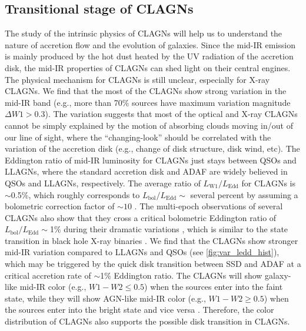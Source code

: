 \documentclass[linenumbers]{aastex631}
\begin{document}

%


\subsection{Transitional stage of CLAGNs}
The study of the intrinsic physics of CLAGNs will help us to understand the nature of accretion flow and the evolution of galaxies. Since the mid-IR emission is mainly produced by the hot dust heated by the UV radiation of the accretion disk, the mid-IR properties of CLAGNs can shed light on their central engines. The physical mechanism for CLAGNs is still unclear, especially for X-ray CLAGNs. We find that the most of the CLAGNs show strong variation in the mid-IR band (e.g., more than 70\% sources have maximum variation magnitude $\Delta W1>0.3$). The variation suggests that most of the optical and X-ray CLAGNs cannot be simply explained by the motion of absorbing clouds moving in/out of our line of sight, where the ``changing-look'' should be correlated with the variation of the accretion disk (e.g., change of disk structure, disk wind, etc). The Eddington ratio of mid-IR luminosity for CLAGNs just stays between QSOs and LLAGNs, where the standard accretion disk and ADAF are widely believed in QSOs and LLAGNs, respectively. The average ratio of $L_\mathrm{W1}/L_\mathrm{Edd}$ for CLAGNs is $\sim $0.5\%, which roughly corresponds to $L_\mathrm{bol}/L_\mathrm{Edd}\sim$ several percent by assuming a bolometric correction factor of $\sim 10$ \citep[e.g.,][]{2012MNRAS.426.2677R}. The multi-epoch observations of several CLAGNs also show that they cross a critical bolometric Eddington ratio of $L_\mathrm{bol}/L_\mathrm{Edd}\sim$1\% during their dramatic variations \citep[e.g.,][]{2019ApJ...883...76R,2021MNRAS.508..144G,2021MNRAS.506.4188L,2021MNRAS.507..687J}, which is similar to the state transition in black hole X-ray binaries \citep[e.g.,][]{2008ApJ...682..212W}. We find that the CLAGNs show stronger mid-IR variation compared to LLAGNs and QSOs (see \autoref{fig:var_ledd_hist}), which may be triggered by the quick disk transition between SSD and ADAF at a critical accretion rate of $\sim$1\% Eddington ratio. The CLAGNs will show galaxy-like mid-IR color (e.g., $W1-W2\leq0.5$) when the sources enter into the faint state, while they will show AGN-like mid-IR color (e.g., $W1-W2\geq0.5$) when the sources enter into the bright state and vice versa \citep[e.g.,][]{2012ApJ...753...30S,2013AJ....145...55Y,2020ApJ...889...46S}. Therefore, the color distribution of CLAGNs also supports the possible disk transition in CLAGNs. 
\end{document}
